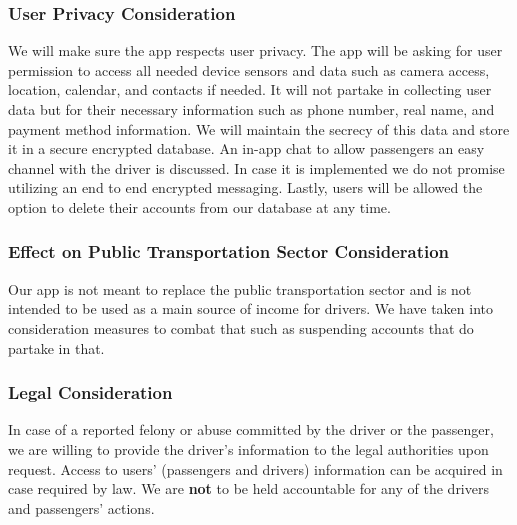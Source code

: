 \documentclass[a4paper, 12pt]{article} %
\begin{document}
                \subsubsection{User Privacy Consideration}
                    We will make sure the app respects user privacy. The app will be asking for user permission to access all needed device sensors and data such as camera access, location, calendar, and contacts if needed. It will not partake in collecting user data but for their necessary information such as phone number, real name, and payment method information. We will maintain the secrecy of this data and store it in a secure encrypted database. An in-app chat to allow passengers an easy channel with the driver is discussed. In case it is implemented we do not promise utilizing an end to end encrypted messaging. Lastly, users will be allowed the option to delete their accounts from our database at any time. 
                \subsubsection{Effect on Public Transportation Sector Consideration}
                    Our app is not meant to replace the public transportation sector and is not intended to be used as a main source of income for drivers. We have taken into consideration measures to combat that such as suspending accounts that do partake in that.
                \subsubsection{Legal Consideration}
                    In case of a reported felony or abuse committed by the driver or the passenger, we are willing to provide the driver's information to the legal authorities upon request. Access to users' (passengers and drivers) information can be acquired in case required by law. We are \textbf{not} to be held accountable for any of the drivers and passengers' actions.

        \pagebreak
\end{document}
